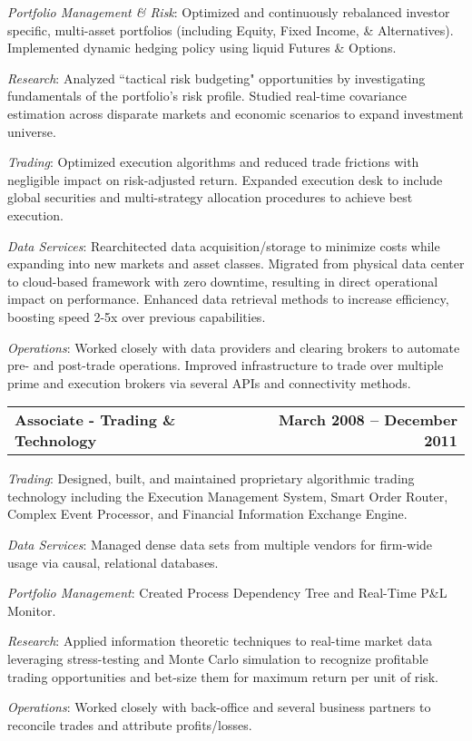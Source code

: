 \documentclass[12pt]{article}
\begin{document}
    \begin{list}{}{\leftmargin=1em}
      \item \textit{Portfolio Management \& Risk}: Optimized and continuously rebalanced
        investor specific, multi-asset portfolios (including Equity, Fixed Income,
        \& Alternatives). Implemented dynamic hedging policy using liquid Futures \& Options.
      \item \textit{Research}: Analyzed ``tactical risk budgeting" opportunities
        by investigating fundamentals of the portfolio's risk profile. Studied real-time
        covariance estimation across disparate markets and economic scenarios to
        expand investment universe. 
      \item \textit{Trading}: Optimized execution algorithms and reduced trade
        frictions with negligible impact on risk-adjusted return. Expanded execution
        desk to include global securities and multi-strategy allocation procedures
        to achieve best execution.
      \item \textit{Data Services}: Rearchitected data acquisition/storage to
        minimize costs while expanding into new markets and asset classes. Migrated
        from physical data center to cloud-based framework with zero downtime,
        resulting in direct operational impact on performance. Enhanced data
        retrieval methods to increase efficiency, boosting speed 2-5x over
        previous capabilities.
      \item \textit{Operations}: Worked closely with data providers and clearing
        brokers to automate pre- and post-trade operations. Improved infrastructure
        to trade over multiple prime and execution brokers via several APIs and
        connectivity methods. 
    \end{list}
  \begin{tabular*}{7.5in}{@{\extracolsep{\fill}}lr}
    \textbf{Associate - Trading \& Technology} & \textbf{March 2008 -- December 2011}
  \end{tabular*}
    \begin{list}{}{\leftmargin=1em}
      \item \textit{Trading}: Designed, built, and maintained proprietary algorithmic
        trading technology including the Execution Management System, Smart Order
        Router, Complex Event Processor, and Financial Information Exchange Engine.
      \item \textit{Data Services}: Managed dense data sets from multiple vendors
        for firm-wide usage via causal, relational databases.
      \item \textit{Portfolio Management}: Created Process Dependency Tree and
        Real-Time P\&L Monitor.
      \item \textit{Research}: Applied information theoretic techniques to real-time
        market data leveraging stress-testing and Monte Carlo simulation to recognize
        profitable trading opportunities and bet-size them for maximum return per unit
        of risk.
      \item \textit{Operations}: Worked closely with back-office and several
        business partners to reconcile trades and attribute profits/losses.
    \end{list}
\end{document}
